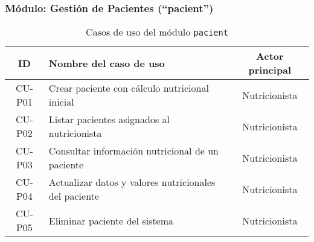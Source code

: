\subsubsection*{Módulo: Gestión de Pacientes (``pacient'')}

\begin{table}[H]
\centering
\begin{tabular}{|c|p{7.5cm}|c|}
\hline
\textbf{ID} & \textbf{Nombre del caso de uso} & \textbf{Actor principal} \\
\hline
CU-P01 & Crear paciente con cálculo nutricional inicial & Nutricionista \\
\hline
CU-P02 & Listar pacientes asignados al nutricionista & Nutricionista \\
\hline
CU-P03 & Consultar información nutricional de un paciente & Nutricionista \\
\hline
CU-P04 & Actualizar datos y valores nutricionales del paciente & Nutricionista \\
\hline
CU-P05 & Eliminar paciente del sistema & Nutricionista \\
\hline
\end{tabular}
\caption{Casos de uso del módulo \texttt{pacient}}
\end{table}




